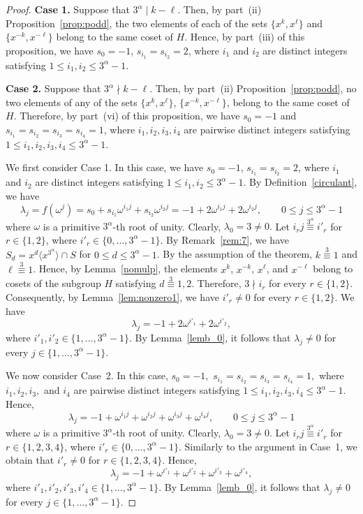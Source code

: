 \documentclass[12pt]{article}
\begin{document}
\begin{proof}
\textbf{Case 1.}  Suppose that $3^\alpha\mid k-\ell$. Then, by part~(ii) Proposition~\ref{prop:podd}, the two elements of each of the sets $\{x^k,x^\ell\}$ and $\{x^{-k},x^{-\ell}\}$ belong to the same coset of $H$. Hence, by part~(iii) of this proposition, we have $s_0=-1$, $s_{i_1}=s_{i_2}=2$, where $i_1$ and $i_2$ are distinct integers satisfying $1\le i_1,i_2\le 3^\alpha-1$.

\textbf{Case 2.} Suppose that $3^\alpha\nmid k-\ell$. Then, by part~(ii) Proposition~\ref{prop:podd}, no two elements of any of the sets $\{x^k,x^\ell\}$, $\{x^{-k},x^{-\ell}\}$, belong to the same coset of $H$. Therefore, by part~(vi) of this proposition, we have $s_0=-1$ and $s_{i_1}=s_{i_2}=s_{i_3}=s_{i_4}=1$, where $i_1,i_2,i_3,i_4$ are pairwise distinct integers satisfying $1\le i_1,i_2,i_3,i_4\le 3^\alpha-1$.

We first consider Case 1. In this case, we have $s_0=-1$, $s_{i_1}=s_{i_2}=2$, where $i_1$ and $i_2$ are distinct integers satisfying $1\le i_1,i_2\le 3^\alpha-1$. By Definition~\ref{circulant}, we have
\[
\lambda_j=f(\omega^j)
=s_0+s_{i_1}\omega^{i_1j}+s_{i_2}\omega^{i_2j}
=-1+2\omega^{i_1j}+2\omega^{i_2j},
\qquad
0\le j\le 3^{\alpha}-1
\]
where $\omega$ is a primitive $3^{\alpha}$-th root of unity. Clearly, $\lambda_0=3\neq0.$ Let $i_rj\stackrel{3^\alpha}{\equiv} i'_r$ for $r\in\{1,2\}$, where $i'_r\in\{0,\ldots,3^\alpha-1\}$. By Remark~\ref{rem:7}, we have $S_d=x^d\langle x^{3^\alpha}\rangle\cap S$ for $0\le d\le 3^\alpha-1$. By the assumption of the theorem, $k\stackrel{3}{\equiv}1$ and $\ell\stackrel{3}{\equiv}1$. Hence, by Lemma~\ref{nomulp}, the elements $x^k$, $x^{-k}$, $x^\ell$, and $x^{-\ell}$ belong to cosets of the subgroup $H$ satisfying $d\stackrel{3}{\equiv}1,2$. Therefore, $3\nmid i_r$ for every $r\in\{1,2\}$. Consequently, by Lemma~\ref{lem:nonzero1}, we have $i'_r\neq0$ for every $r\in\{1,2\}$. We have
\[
\lambda_j=-1+2\omega^{i'_1}+2\omega^{i'_2},
\]
where $i'_1,i'_2\in\{1,\ldots,3^\alpha-1\}.$ By Lemma~\ref{lemb_0}, it follows that \(\lambda_j\neq0\) for every \(j\in\{1,\ldots,3^\alpha-1\}\).

We now consider Case~2. In this case,
$
s_0=-1,$
$s_{i_1}=s_{i_2}=s_{i_3}=s_{i_4}=1,$
where \(i_1,i_2,i_3,\) and \(i_4\) are pairwise distinct integers satisfying
$
1\le i_1,i_2,i_3,i_4\le 3^{\alpha}-1.
$
Hence,
\[
\lambda_j
=
-1+\omega^{i_1j}+\omega^{i_2j}+\omega^{i_3j}+\omega^{i_4j}, \qquad
0\le j\le 3^{\alpha}-1
\]
where $\omega$ is a primitive $3^{\alpha}$-th root of unity. Clearly,
$\lambda_0=3\neq0.$ Let $i_rj\stackrel{3^\alpha}{\equiv} i'_r$ for $r\in\{1,2,3,4\}$, where $i'_r\in\{0,\ldots,3^\alpha-1\}$. Similarly to the argument in Case~1, we obtain that $i'_r\neq 0$ for $r\in\{1,2,3,4\}$. Hence,
\[
\lambda_j=-1+\omega^{i'_1}+\omega^{i'_2}+\omega^{i'_3}+\omega^{i'_4},
\]
where $i'_1,i'_2,i'_3,i'_4\in\{1,\ldots,3^\alpha-1\}$. By Lemma~\ref{lemb_0}, it follows that $\lambda_j\neq 0$ for every $j\in\{1,\ldots,3^\alpha-1\}$.


\end{proof}
\end{document}
